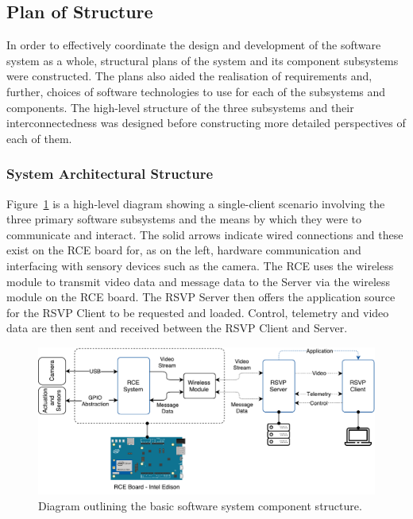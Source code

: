   \subsection{Plan of Structure}
    In order to effectively coordinate the design and development of the software system as a whole, structural plans of the system and its component subsystems were constructed. The plans also aided the realisation of requirements and, further, choices of software technologies to use for each of the subsystems and components. The high-level structure of the three subsystems and their interconnectedness was designed before constructing more detailed perspectives of each of them.
    
    \subsubsection{System Architectural Structure}            
      Figure~\ref{fig:softDesign-sysArchitectureStructure} is a high-level diagram showing a single-client scenario involving the three primary software subsystems and the means by which they were to communicate and interact. The solid arrows indicate wired connections and these exist on the RCE board for, as on the left, hardware communication and interfacing with sensory devices such as the camera. The RCE uses the wireless module to transmit video data and message data to the Server via the wireless module on the RCE board. The RSVP Server then offers the application source for the RSVP Client to be requested and loaded. Control, telemetry and video data are then sent and received between the RSVP Client and Server.

      \begin{figure}[h!]
        \centering
        \includegraphics[width=1\linewidth]{figures/softDesign-sysArchitectureStructure}
        \caption[Diagram outlining the basic software system component structure.]{Diagram outlining the basic software system component structure.}
        \label{fig:softDesign-sysArchitectureStructure}
      \end{figure}
      
